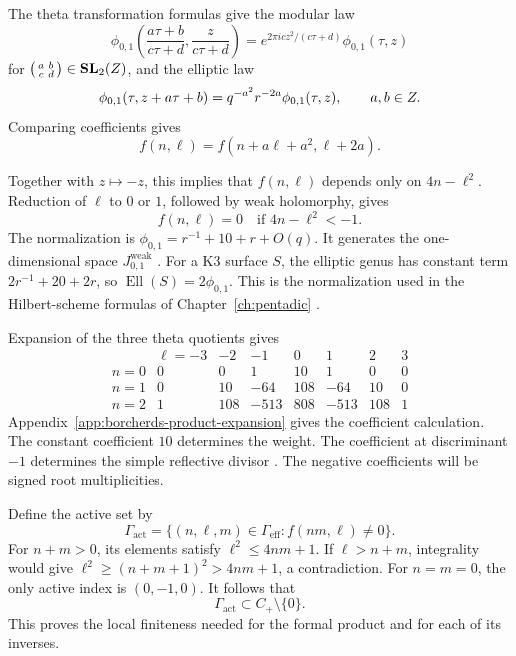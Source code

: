 The theta transformation formulas give the modular law
\[
 \phi_{0,1}\!\left(\frac{a\tau+b}{c\tau+d},\frac z{c\tau+d}\right)
 =e^{2\pi icz^2/(c\tau+d)}\phi_{0,1}(\tau,z)
\]
for \(\bigl(\begin{smallmatrix}a&b\\c&d\end{smallmatrix}\bigr)
\in\mathbf{SL}_2(Z)\), and the elliptic law
\[
 \phi_{0,1}(\tau,z+a\tau+b)
 =q^{-a^2}r^{-2a}\phi_{0,1}(\tau,z),
 \qquad a,b\in Z.
\]
Comparing coefficients gives
\[
 f(n,\ell)=f(n+a\ell+a^2,\ell+2a).
\]

Together with \(z\mapsto-z\), this implies that \(f(n,\ell)\)
depends only on \(4n-\ell^2\).  Reduction of \(\ell\) to \(0\) or
\(1\), followed by weak holomorphy, gives
\[
 f(n,\ell)=0\quad\text{if }4n-\ell^2<-1.
\]
The normalization is
\(\phi_{0,1}=r^{-1}+10+r+O(q)\).
It generates the one-dimensional space \(J_{0,1}^{\mathrm{weak}}\)
\cite{EZ:1}.  For a K3 surface \(S\), the elliptic genus has constant
term \(2r^{-1}+20+2r\), so
\(\operatorname{Ell}(S)=2\phi_{0,1}\).
This is the normalization used in the Hilbert-scheme formulas of
Chapter~\ref{ch:pentadic} \cite{DMVV}.

Expansion of the three theta quotients gives
\begin{equation}
\label{eq:view1-phi01-coefficients}
\begin{array}{c|rrrrrrr}
 &\ell=-3&-2&-1&0&1&2&3\\ \hline
 n=0&0&0&1&10&1&0&0\\
 n=1&0&10&-64&108&-64&10&0\\
 n=2&1&108&-513&808&-513&108&1
\end{array}
\end{equation}
Appendix~\ref{app:borcherds-product-expansion} gives the coefficient
calculation.  The constant coefficient \(10\) determines the weight.
The coefficient at discriminant \(-1\) determines the simple
reflective divisor \cite{Gritsenko2018Reflective}.
The negative coefficients will be signed root
multiplicities.

Define the active set by
\[
 \Gamma_{\mathrm{act}}
 =\{(n,\ell,m)\in\Gamma_{\mathrm{eff}}:f(nm,\ell)\ne0\}.
\]
For \(n+m>0\), its elements satisfy
\(\ell^2\leq4nm+1\).  If \(\ell>n+m\), integrality would give
\(\ell^2\geq(n+m+1)^2>4nm+1\), a contradiction.
For \(n=m=0\), the only active index is \((0,-1,0)\).
It follows that
\[
 \Gamma_{\mathrm{act}}\subset C_+\setminus\{0\}.
\]
This proves the local finiteness needed for the formal product and
for each of its inverses.

